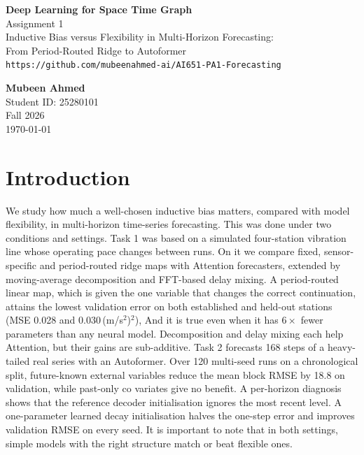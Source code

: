 \documentclass[11pt,a4paper]{article}
\begin{document}
\begin{titlepage}
    \centering
    \vspace*{2cm}
    {\Huge\bfseries Deep Learning for Space Time Graph\\[0.5cm]}
    {\LARGE Assignment 1\\[0.3cm]}
    {\small Inductive Bias versus Flexibility in Multi-Horizon Forecasting:\\ From Period-Routed Ridge to Autoformer\\[2cm]}
    \nolinkurl{https://github.com/mubeenahmed-ai/AI651-PA1-Forecasting}
    
    \vspace{1cm}
    {\Large\bfseries Mubeen Ahmed\\[0.3cm]}
    {\large Student ID: 25280101\\[0.3cm]}
    \vfill
    {\large Fall 2026\\[0.3cm]}
    {\large \today\\[0.5cm]}
    
    
\end{titlepage}

\section{Introduction }
    

We study how much a well-chosen inductive bias matters, compared with model flexibility, in multi-horizon time-series forecasting. This was done under two conditions and settings. Task 1 was based on a simulated four-station vibration line whose operating pace changes between runs. On it we compare fixed, sensor-specific and period-routed ridge maps with Attention forecasters, extended by moving-average decomposition and FFT-based delay mixing. A period-routed linear map, which is given the one variable that changes the correct continuation, attains the lowest validation error on both established and held-out stations (MSE 0.028 and 0.030\,(m/s$^2$)$^2$), And it is true even when it has $6\times$ fewer parameters than any neural model. Decomposition and delay mixing each help Attention, but their gains are sub-additive. Task 2 forecasts 168 steps of a heavy-tailed real series with an Autoformer. Over 120 multi-seed runs on a chronological split, future-known external variables reduce the mean block RMSE by 18.8 on validation, while past-only co variates give no benefit. A per-horizon diagnosis shows that the reference decoder initialisation ignores the most recent level. A one-parameter learned decay initialisation halves the one-step error and improves validation RMSE on every seed. It is important to note that in both settings, simple models with the right structure match or beat flexible ones. \\ 
\end{document}
